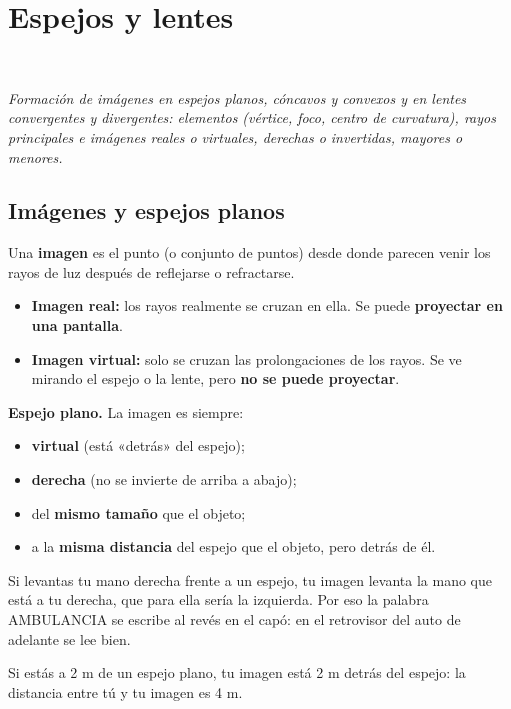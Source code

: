 \section[Espejos y lentes]{Espejos y lentes}
\modcomun\ \ {\color{gris}\itshape Formación de imágenes en espejos planos, cóncavos y convexos y en lentes convergentes y divergentes: elementos (vértice, foco, centro de curvatura), rayos principales e imágenes reales o virtuales, derechas o invertidas, mayores o menores.\par}
\subsection{Imágenes y espejos planos}
Una \textbf{imagen} es el punto (o conjunto de puntos) desde donde parecen venir los rayos de luz después de reflejarse o refractarse.

 
\begin{itemize}
  \item \textbf{Imagen real:} los rayos realmente se cruzan en ella. Se puede \textbf{proyectar en una pantalla}.
  \item \textbf{Imagen virtual:} solo se cruzan las prolongaciones de los rayos. Se ve mirando el espejo o la lente, pero \textbf{no se puede proyectar}.
\end{itemize}
 

\textbf{Espejo plano.} La imagen es siempre:

 
\begin{itemize}
  \item \textbf{virtual} (está «detrás» del espejo);
  \item \textbf{derecha} (no se invierte de arriba a abajo);
  \item del \textbf{mismo tamaño} que el objeto;
  \item a la \textbf{misma distancia} del espejo que el objeto, pero detrás de él.
\end{itemize}
  
\begin{clave} Si levantas tu mano derecha frente a un espejo, tu imagen levanta la mano que está a tu derecha, que para ella sería la izquierda. Por eso la palabra AMBULANCIA se escribe al revés en el capó: en el retrovisor del auto de adelante se lee bien.\end{clave}
 
\begin{clave}[{Recuerda}] Si estás a 2 m de un espejo plano, tu imagen está 2 m detrás del espejo: la distancia entre tú y tu imagen es 4 m.\end{clave}

